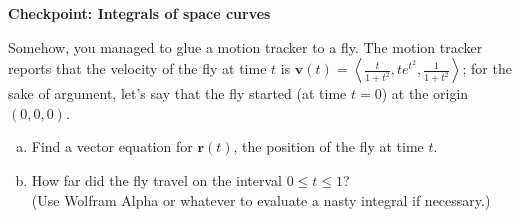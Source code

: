 \documentclass[12pt]{article}
\newcommand{\vv}{\mathbf{v}}
\newcommand{\vr}{\mathbf{r}}
\renewcommand{\section}[1]{\begin{center} \textbf{#1} \\\end{center}}
\begin{document}
%


\allowdisplaybreaks
\section{Checkpoint: Integrals of space curves}

Somehow, you managed to glue a motion tracker to a fly. The motion tracker reports that the velocity of the fly at time $t$ is $\displaystyle\vv(t) = \left\langle \frac{t}{1+t^2}, te^{t^2}, \frac{1}{1+t^2} \right\rangle$; for the sake of argument, let's say that the fly started (at time $t=0$) at the origin $(0,0,0)$.

\begin{enumerate}[(a)]
    \item Find a vector equation for $\vr(t)$, the position of the fly at time $t$.
    \item How far did the fly travel on the interval $0\leq t \leq 1$? \\(Use Wolfram Alpha or whatever to evaluate a nasty integral if necessary.)
\end{enumerate}

	
\end{document}
